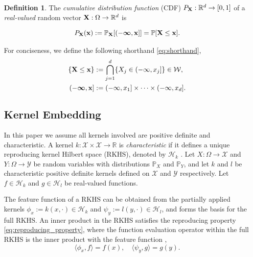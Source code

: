 \documentclass[twoside]{article} \usepackage{aistats2017}
\theoremstyle{definition}
\newtheorem{definition}{Definition}[section]
\theoremstyle{theorem}
\newcommand{\rv}[1]{{#1}}
\newcommand{\inner}[2]{{\langle #1, #2 \rangle}}
\newcommand{\Hk}{\mathcal{H}_{k}}
\newcommand{\Hl}{\mathcal{H}_{l}}
\begin{document}
	\begin{definition} \label{def:cdf}
		\citep{bauer1981probability}
		The \textit{cumulative distribution function} (CDF) $P_{\bvec{\rv{X}}} : \mathbb{R}^{d} \to [0, 1]$ of a \textit{real-valued} random vector $\bvec{\rv{X}} : \Omega \to \mathbb{R}^{d}$ is
		
		\begin{equation}
				P_{\bvec{\rv{X}}}(\bvec{x}) := \mathbb{P}_{\bvec{\rv{X}}}[(-\bm{\infty}, \bvec{x}]] = \mathbb{P}[\bvec{\rv{X}} \leq \bvec{x}].
		\label{eq:cdf}
		\end{equation}

		For conciseness, we define the following shorthand \eqref{eq:shorthand},
		\begin{equation}
			\begin{aligned}
				\{\bvec{\rv{X}} \leq \bvec{x}\} &:= \bigcap\limits_{j = 1}^{d} \{\rv{X}_{j} \in (-\infty, x_{j}]\} \in \mathcal{W}, \\
				(-\bm{\infty}, \bvec{x}] &:= (-\infty, x_{1}] \times \dots \times (-\infty, x_{d}]. \\
			\end{aligned}
		\label{eq:shorthand}
		\end{equation}
	\end{definition}
		
	\subsection{Kernel Embedding}
	\label{sec:background:kernel_embedding}
	

		In this paper we assume all kernels involved are positive definite and characteristic. A kernel $k : \mathcal{X} \times \mathcal{X} \to \mathbb{R}$ is \textit{characteristic} if it defines a unique reproducing kernel Hilbert space (RKHS), denoted by $\mathcal{H}_{k}$ \citep{fukumizu2004dimensionality}. Let $\rv{X} : \Omega \to \mathcal{X}$ and $\rv{Y} : \Omega \to \mathcal{Y}$ be random variables with distributions $\mathbb{P}_{\rv{X}}$ and $\mathbb{P}_{\rv{Y}}$, and let $k$ and $l$ be characteristic positive definite kernels defined on $\mathcal{X}$ and $\mathcal{Y}$ respectively. Let $f \in \Hk$ and $g \in \Hl$ be real-valued functions.
		
		The feature function of a RKHS can be obtained from the partially applied kernels $\phi_{x} := k(x, \cdot) \in \Hk$ and $\psi_{y} := l(y, \cdot) \in \Hl$, and forms the basis for the full RKHS. An inner product in the RKHS satisfies the reproducing property \eqref{eq:reproducing_property}, where the function evaluation operator within the full RKHS is the inner product with the feature function \citep{muandet2016kernel},
		\begin{equation}
			\inner{\phi_{x}}{f} = f(x) ,\quad \inner{\psi_{y}}{g} = g(y).
		\label{eq:reproducing_property}
		\end{equation}
		
\end{document}
